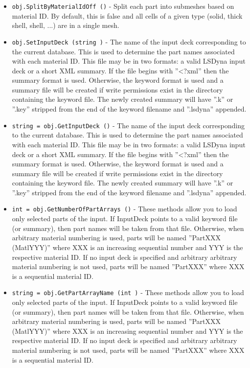 \begin{itemize}
\item  \verb|obj.SplitByMaterialIdOff ()| -  Split each part into submeshes based on material ID.
 By default, this is false and all cells of a given
 type (solid, thick shell, shell, ...) are in a single mesh.

\item  \verb|obj.SetInputDeck (string )| -  The name of the input deck corresponding to the current database.
 This is used to determine the part names associated with each material ID.
 This file may be in two formats: a valid LSDyna input deck or a 
 short XML summary.
 If the file begins with ''<?xml'' then the summary format is used.
 Otherwise, the keyword format is used and a summary file will be
 created if write permissions exist in the directory containing
 the keyword file. The newly created summary will have ''.k'' or ''.key''
 stripped from the end of the keyword filename and ''.lsdyna'' appended.

\item  \verb|string = obj.GetInputDeck ()| -  The name of the input deck corresponding to the current database.
 This is used to determine the part names associated with each material ID.
 This file may be in two formats: a valid LSDyna input deck or a 
 short XML summary.
 If the file begins with ''<?xml'' then the summary format is used.
 Otherwise, the keyword format is used and a summary file will be
 created if write permissions exist in the directory containing
 the keyword file. The newly created summary will have ''.k'' or ''.key''
 stripped from the end of the keyword filename and ''.lsdyna'' appended.

\item  \verb|int = obj.GetNumberOfPartArrays ()| -  These methods allow you to load only selected parts of the input.
 If InputDeck points to a valid keyword file (or summary), then part
 names will be taken from that file.
 Otherwise, when arbitrary material numbering is used, parts will be named
 ''PartXXX (MatlYYY)'' where XXX is an increasing sequential number and YYY
 is the respective material ID. If no input deck is specified and arbitrary
 arbitrary material numbering is not used, parts will be named
 ''PartXXX'' where XXX is a sequential material ID.

\item  \verb|string = obj.GetPartArrayName (int )| -  These methods allow you to load only selected parts of the input.
 If InputDeck points to a valid keyword file (or summary), then part
 names will be taken from that file.
 Otherwise, when arbitrary material numbering is used, parts will be named
 ''PartXXX (MatlYYY)'' where XXX is an increasing sequential number and YYY
 is the respective material ID. If no input deck is specified and arbitrary
 arbitrary material numbering is not used, parts will be named
 ''PartXXX'' where XXX is a sequential material ID.


\end{itemize}
